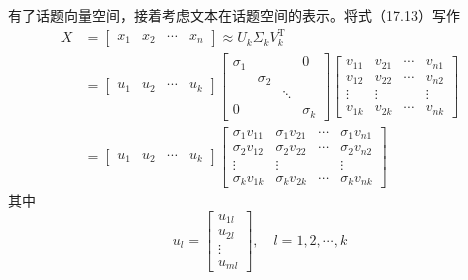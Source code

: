 \documentclass[UTF8, 12pt, fontset=fandol, oneside]{ctexart}
\begin{document}
有了话题向量空间，接着考虑文本在话题空间的表示。将式（17.13）写作
\begin{equation}
\begin{aligned}
X&=
\begin{bmatrix}
x_1 & x_2 & \cdots & x_n
\end{bmatrix}
\approx U_k\Sigma_kV_k^{\mathrm{T}}\\
&=
\begin{bmatrix}
u_1 & u_2 & \cdots & u_k
\end{bmatrix}
\begin{bmatrix}
\sigma_1 & & & 0\\
& \sigma_2 & & \\
& & \ddots & \\
0 & & & \sigma_k
\end{bmatrix}
\begin{bmatrix}
v_{11} & v_{21} & \cdots & v_{n1}\\
v_{12} & v_{22} & \cdots & v_{n2}\\
\vdots & \vdots & & \vdots\\
v_{1k} & v_{2k} & \cdots & v_{nk}
\end{bmatrix}\\
&=
\begin{bmatrix}
u_1 & u_2 & \cdots & u_k
\end{bmatrix}
\begin{bmatrix}
\sigma_1 v_{11} & \sigma_1 v_{21} & \cdots & \sigma_1 v_{n1}\\
\sigma_2 v_{12} & \sigma_2 v_{22} & \cdots & \sigma_2 v_{n2}\\
\vdots & \vdots & & \vdots\\
\sigma_k v_{1k} & \sigma_k v_{2k} & \cdots & \sigma_k v_{nk}
\end{bmatrix}
\end{aligned}
\tag{17.14}
\end{equation}
其中
\[
u_l=
\begin{bmatrix}
u_{1l}\\
u_{2l}\\
\vdots\\
u_{ml}
\end{bmatrix},
\quad l=1,2,\cdots,k
\]
\end{document}
